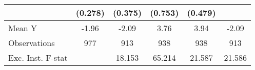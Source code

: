 {\begin{tabular}{l*{5}{c}}
            &     (0.278)         &     (0.375)         &     (0.753)         &     (0.479)         &                     \\
\midrule
Mean Y      &       -1.96         &       -2.09         &        3.76         &        3.94         &       -2.09         \\
Observations&         977         &         913         &         938         &         938         &         913         \\
Exc. Inst. F-stat&                     &      18.153         &      65.214         &      21.587         &      21.586         \\
\bottomrule
\end{tabular}
}
